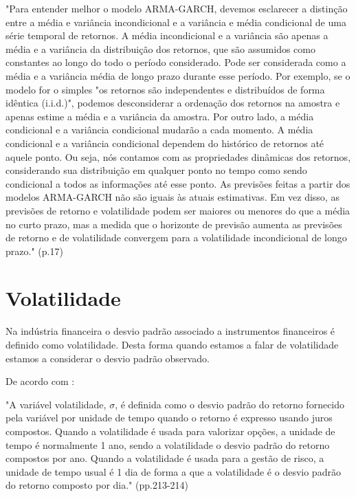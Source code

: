 \documentclass[
  12pt,
  a4paper,
  openany]{book}
\begin{document}
\begin{spacing}{1}
\begin{adjustwidth}{28.3464pt}{28.3464pt}\footnotesize
"Para entender melhor o modelo ARMA-GARCH, devemos esclarecer a distinção entre a média e variância incondicional e a variância e média  condicional de uma série temporal de retornos. A média incondicional e a variância são apenas a média e a variância da distribuição dos retornos, que são assumidos como constantes ao longo do todo o período considerado. Pode ser considerada como a média e a variância média de longo prazo durante esse período. Por exemplo, se o modelo for o simples "os retornos são independentes e distribuídos de forma idêntica (i.i.d.)", podemos desconsiderar a ordenação dos retornos na amostra e apenas estime a média e a variância da amostra.
Por outro lado, a média condicional e a variância condicional mudarão a cada momento. A média condicional e a variância condicional dependem do histórico de retornos até aquele ponto. Ou seja, nós contamos com as propriedades dinâmicas dos retornos, considerando sua distribuição em qualquer ponto no tempo como sendo condicional a todos as informações até esse ponto. As previsões feitas a partir dos modelos ARMA-GARCH não são iguais às atuais estimativas. Em vez disso, as previsões de retorno e volatilidade podem ser maiores ou menores do que a média no curto prazo, mas a medida que o horizonte de previsão aumenta as previsões de retorno e de volatilidade convergem para a volatilidade incondicional de longo prazo." (p.17)
\normalsize\end{adjustwidth}
\end{spacing}
\medskip

\hypertarget{volatilidade}{%
\section{Volatilidade}\label{volatilidade}}

Na indústria financeira o desvio padrão associado a instrumentos financeiros é definido como volatilidade. Desta forma quando estamos a falar de volatilidade estamos a considerar o desvio padrão observado.

De acordo com \citet{HullRisk2018}:

\begin{spacing}{1}
\begin{adjustwidth}{28.3464pt}{28.3464pt}\footnotesize
"A variável volatilidade, $\sigma$, é definida como o desvio padrão do retorno fornecido pela variável por unidade de tempo quando o retorno é expresso usando juros compostos. Quando a volatilidade é usada para valorizar opções, a unidade de tempo é normalmente 1 ano, sendo a volatilidade o desvio padrão do retorno compostos por ano. Quando a volatilidade é usada para a gestão de risco, a unidade de tempo usual é 1 dia de forma a que a volatilidade é o desvio padrão do retorno composto por dia." (pp.213-214)
\normalsize\end{adjustwidth}
\end{spacing}
\medskip
\end{document}
